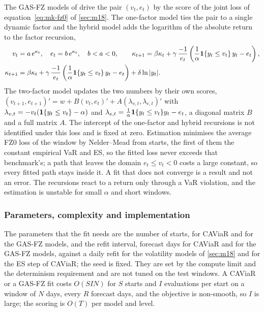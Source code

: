 The GAS-FZ models of \citet{market:pattonziegelchen2019} drive the pair $(v_t,e_t)$ by the score of the joint loss of equation~\eqref{eq:mk-fz0}
of \cref{sec:m18}. The one-factor model ties the pair to a single dynamic factor and the hybrid model adds the logarithm of the absolute return to the
factor recursion,
\begin{align}
v_t&=a\,e^{\kappa_t},\quad e_t=b\,e^{\kappa_t},\quad b<a<0,\qquad
\kappa_{t+1}=\beta\kappa_t+\gamma\,\frac{-1}{e_t}\left(\frac1\alpha\mathbf{1}\{y_t\le v_t\}\,y_t-e_t\right), \label{eq:mk-gas1}\\
\kappa_{t+1}&=\beta\kappa_t+\gamma\,\frac{-1}{e_t}\left(\frac1\alpha\mathbf{1}\{y_t\le v_t\}\,y_t-e_t\right)+\delta\ln|y_t|. \label{eq:mk-gash}
\end{align}
The two-factor model updates the two numbers by their own scores, $(v_{t+1},e_{t+1})'=w+B(v_t,e_t)'+A(\lambda_{v,t},\lambda_{e,t})'$ with
$\lambda_{v,t}=-v_t(\mathbf{1}\{y_t\le v_t\}-\alpha)$ and $\lambda_{e,t}=\frac1\alpha\mathbf{1}\{y_t\le v_t\}y_t-e_t$, a diagonal matrix $B$ and a
full matrix $A$. The intercept of the one-factor and hybrid recursions is not identified under this loss and is fixed at zero. Estimation
minimises the average FZ0 loss of the window by Nelder--Mead from \mkGasStarts{} starts, the first of them the constant empirical VaR and
ES, so the fitted loss never exceeds that benchmark's; a path that leaves the domain $e_t\le v_t<0$ costs a large constant, so every fitted
path stays inside it. A fit that does not converge is a result and not an error. The recursions react to a return only through a VaR
violation, and the estimation is unstable for small $\alpha$ and short windows.

\subsubsection{Parameters, complexity and implementation}
The parameters that the fit needs are the number of starts, \mkCaviarStarts{} for CAViaR and \mkGasStarts{} for the GAS-FZ models, and the refit
interval, \mkCaviarRefit{} forecast days for CAViaR and \mkGasRefit{} for the GAS-FZ models, against a daily refit
for the volatility models of \cref{sec:m18} and for the ES step of CAViaR; the seed \mkSeed{} is fixed. They are set by the compute limit and the
determinism requirement and are not tuned on the test windows. A CAViaR or a GAS-FZ fit costs $O(SIN)$ for $S$ starts and $I$ evaluations per
start on a window of $N$ days, every $R$ forecast days, and the objective is non-smooth, so $I$ is large; the scoring is $O(T)$ per model and level.


